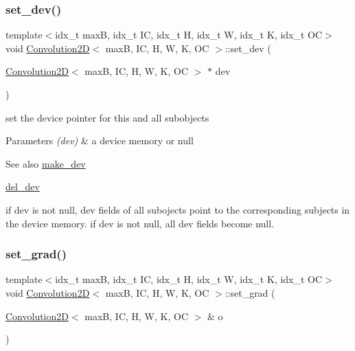 \subsubsection{\texorpdfstring{set\+\_\+dev()}{set\_dev()}}
{\footnotesize\ttfamily template$<$idx\+\_\+t maxB, idx\+\_\+t IC, idx\+\_\+t H, idx\+\_\+t W, idx\+\_\+t K, idx\+\_\+t OC$>$ \\
void \hyperlink{structConvolution2D}{Convolution2D}$<$ maxB, IC, H, W, K, OC $>$\+::set\+\_\+dev (\begin{DoxyParamCaption}\item[{\hyperlink{structConvolution2D}{Convolution2D}$<$ maxB, IC, H, W, K, OC $>$ $\ast$}]{dev }\end{DoxyParamCaption})\hspace{0.3cm}{\ttfamily [inline]}}



set the device pointer for this and all subobjects 


\begin{DoxyParams}{Parameters}
{\em (dev)} & a device memory or null \\
\hline
\end{DoxyParams}
\begin{DoxySeeAlso}{See also}
\hyperlink{structConvolution2D_a9c6908bf3797c1b38dec8c33beb8df49}{make\+\_\+dev} 

\hyperlink{structConvolution2D_a3f508b68dc981593f5a2980e6b88a247}{del\+\_\+dev}
\end{DoxySeeAlso}
if dev is not null, dev fields of all subojects point to the corresponding subjects in the device memory. if dev is not null, all dev fields become null. \mbox{\label{structConvolution2D_a8b1f4363ec5f6d3d69890599a0e426da}} 
\subsubsection{\texorpdfstring{set\+\_\+grad()}{set\_grad()}}
{\footnotesize\ttfamily template$<$idx\+\_\+t maxB, idx\+\_\+t IC, idx\+\_\+t H, idx\+\_\+t W, idx\+\_\+t K, idx\+\_\+t OC$>$ \\
void \hyperlink{structConvolution2D}{Convolution2D}$<$ maxB, IC, H, W, K, OC $>$\+::set\+\_\+grad (\begin{DoxyParamCaption}\item[{\hyperlink{structConvolution2D}{Convolution2D}$<$ maxB, IC, H, W, K, OC $>$ \&}]{o }\end{DoxyParamCaption})\hspace{0.3cm}{\ttfamily [inline]}}



